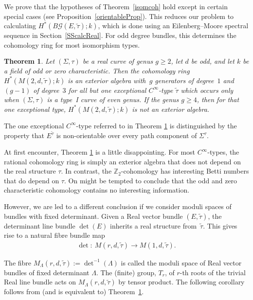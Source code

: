 \documentclass[10pt,a4paper]{amsart}
\numberwithin{equation}{section}
\newtheorem{Theorem}{Theorem}[section]
\begin{document}
We prove that the hypotheses of Theorem~\ref{isomcoh} hold except in certain special cases (see Proposition~\ref{orientableProp}). This reduces our problem to calculating $H^*(B{\mathcal G}(E,\tilde{\tau}); k)$, which is done using an Eilenberg--Moore spectral sequence in Section~\ref{SScalcReal}. For odd degree bundles, this determines the cohomology ring for most isomorphism types.


\begin{Theorem}\label{bigthm}
Let $(\Sigma,\tau)$ be a real curve of genus $g\geq 2$, let $d$ be odd, and let $k$ be a field of odd or zero characteristic. Then the cohomology ring $ H^*(M(2,d,\tilde{\tau}); k)$ is an exterior algebra with~$g$ generators of degree~$1$ and $(g-1)$ of degree~$3$ for all but one exceptional $C^{\infty}$-type $\tilde{\tau}$ which occurs only when $(\Sigma,\tau)$ is a type~I curve of even genus.
If the genus $g \geq 4$, then for that one exceptional type, $H^*(M(2,d,\tilde{\tau}); k)$ is not an exterior algebra.
\end{Theorem}


The one exceptional $C^{\infty}$-type referred to in Theorem \ref{bigthm} is distinguished by the property that $E^{\tilde{\tau}}$ is non-orientable over every path component of $\Sigma^{\tau}$.

At f\/irst encounter, Theorem \ref{bigthm} is a little disappointing. For most $C^{\infty}$-types, the rational cohomology ring is simply an exterior algebra that does not depend on the real structure $\tau$. In contrast, the ${\mathbb Z}_2$-cohomology has interesting Betti numbers that do depend on $\tau$. On might be tempted to conclude that the odd and zero characteristic cohomology contains no interesting information.

However, we are led to a dif\/ferent conclusion if we consider moduli spaces of bundles with f\/ixed determinant. Given a Real vector bundle $(E,\tilde{\tau})$, the determinant line bundle $\det(E)$ inherits a real structure from~$\tilde{\tau}$. This gives rise to a natural f\/ibre bundle map
\begin{gather*} \det \colon \ M(r,d,\tilde{\tau}) \rightarrow M(1,d,\tilde{\tau}).\end{gather*}

The f\/ibre $M_{\Lambda}(r,d,\tilde{\tau}):= \det^{-1}(\Lambda)$ is called the moduli space of Real vector bundles of f\/ixed determinant $\Lambda$. The (f\/inite) group, $T_r$, of $r$-th roots of the trivial Real line bundle acts on $M_{\Lambda}(r,d,\tilde{\tau})$ by tensor product. The following corollary follows from (and is equivalent to) Theorem~\ref{bigthm}.
\end{document}
